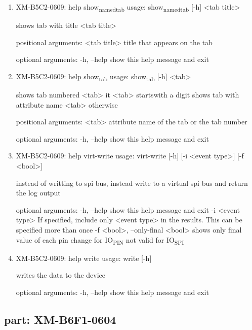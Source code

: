 \documentclass[11pt]{article}
\begin{document}
\begin{enumerate}
\item XM-B5C2-0609: help show\textsubscript{named}\textsubscript{tab}
\label{sec:org7f09934}
usage: show\textsubscript{named}\textsubscript{tab} [-h] <tab title>

shows tab with title <tab title>

positional arguments:
  <tab title>  title that appears on the tab

optional arguments:
  -h, --help   show this help message and exit

\item XM-B5C2-0609: help show\textsubscript{tab}
\label{sec:org0511492}
usage: show\textsubscript{tab} [-h] <tab>

shows tab numbered <tab> it <tab> startswith a digit shows tab with attribute
name <tab> otherwise

positional arguments:
  <tab>       attribute name of the tab or the tab number

optional arguments:
  -h, --help  show this help message and exit

\item XM-B5C2-0609: help virt-write
\label{sec:org83895b7}
usage: virt-write [-h] [-i <event type>] [-f <bool>]

instead of writting to spi bus, instead write to a virtual spi bus and return
the log output

optional arguments:
  -h, --help            show this help message and exit
  -i <event type>       If specified, include only <event type> in the
                        results. This can be specified more than once
  -f <bool>, --only-final <bool>
                        shows only final value of each pin change for IO\textsubscript{PIN}
                        not valid for IO\textsubscript{SPI}

\item XM-B5C2-0609: help write
\label{sec:org6a3f46a}
usage: write [-h]

writes the data to the device

optional arguments:
  -h, --help  show this help message and exit
\end{enumerate}

\subsection{part: XM-B6F1-0604}
\label{sec:org51ee014}
\end{document}
